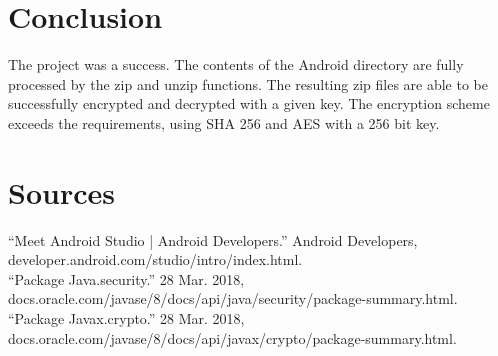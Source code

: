 \documentclass[10pt,a4paper]{article}
\begin{document}
\section{Conclusion}
The project was a success. The contents of the Android directory are fully processed by the zip and unzip functions. The resulting zip files are able to be successfully encrypted and decrypted with a given key. The encryption scheme exceeds the requirements, using SHA 256 and AES with a 256 bit key. 

\section{Sources}

 “Meet Android Studio  |  Android Developers.” Android Developers, developer.android.com/studio/intro/index.html.
\\

“Package Java.security.” 28 Mar. 2018, docs.oracle.com/javase/8/docs/api/java/security/package-summary.html.
\\

“Package Javax.crypto.” 28 Mar. 2018, docs.oracle.com/javase/8/docs/api/javax/crypto/package-summary.html. 
\end{document}
